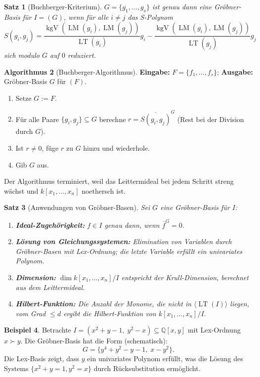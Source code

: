 \documentclass[12pt,a4paper]{amsart}
\newtheorem{theorem}{Satz}[section]
\theoremstyle{definition}
\newtheorem{example}[theorem]{Beispiel}
\theoremstyle{definition}
\newtheorem{algorithm}[theorem]{Algorithmus}
\begin{document}
\begin{theorem}[Buchberger-Kriterium]
$G = \{g_1,\ldots,g_s\}$ ist genau dann eine Gröbner-Basis für $I = (G)$, wenn
für alle $i \neq j$ das \emph{S-Polynom}
\[
  S(g_i, g_j) = \frac{\operatorname{kgV}(\operatorname{LM}(g_i), \operatorname{LM}(g_j))}{\operatorname{LT}(g_i)} g_i
  - \frac{\operatorname{kgV}(\operatorname{LM}(g_i), \operatorname{LM}(g_j))}{\operatorname{LT}(g_j)} g_j
\]
sich modulo $G$ auf $0$ reduziert.
\end{theorem}

\begin{algorithm}[Buchberger-Algorithmus]
\textbf{Eingabe:} $F = \{f_1,\ldots,f_s\}$; \textbf{Ausgabe:} Gröbner-Basis $G$ für $(F)$.
\begin{enumerate}
  \item Setze $G := F$.
  \item Für alle Paare $\{g_i, g_j\} \subseteq G$ berechne $r = \overline{S(g_i,g_j)}^G$
        (Rest bei der Division durch $G$).
  \item Ist $r \neq 0$, füge $r$ zu $G$ hinzu und wiederhole.
  \item Gib $G$ aus.
\end{enumerate}
Der Algorithmus terminiert, weil das Leittermideal bei jedem Schritt streng wächst
und $k[x_1,\ldots,x_n]$ noethersch ist.
\end{algorithm}

\begin{theorem}[Anwendungen von Gröbner-Basen]
Sei $G$ eine Gröbner-Basis für $I$:
\begin{enumerate}[label=(\roman*)]
  \item \textbf{Ideal-Zugehörigkeit:} $f \in I$ genau dann, wenn $\overline{f}^G = 0$.
  \item \textbf{Lösung von Gleichungssystemen:} Elimination von Variablen durch
        Gröbner-Basen mit Lex-Ordnung; die letzte Variable erfüllt ein univariates Polynom.
  \item \textbf{Dimension:} $\dim k[x_1,\ldots,x_n]/I$ entspricht der Krull-Dimension,
        berechnet aus dem Leittermideal.
  \item \textbf{Hilbert-Funktion:} Die Anzahl der Monome, die nicht in
        $\langle \operatorname{LT}(I) \rangle$ liegen, vom Grad $\leq d$ ergibt die
        Hilbert-Funktion von $k[x_1,\ldots,x_n]/I$.
\end{enumerate}
\end{theorem}

\begin{example}
Betrachte $I = (x^2 + y - 1,\; y^2 - x) \subseteq \mathbb{Q}[x,y]$ mit Lex-Ordnung
$x \succ y$. Die Gröbner-Basis hat die Form (schematisch):
\[
  G = \{y^4 + y^2 - y - 1,\; x - y^2\}.
\]
Die Lex-Basis zeigt, dass $y$ ein univariates Polynom erfüllt, was die Lösung des
Systems $\{x^2 + y = 1, y^2 = x\}$ durch Rücksubstitution ermöglicht.
\end{example}
\end{document}
